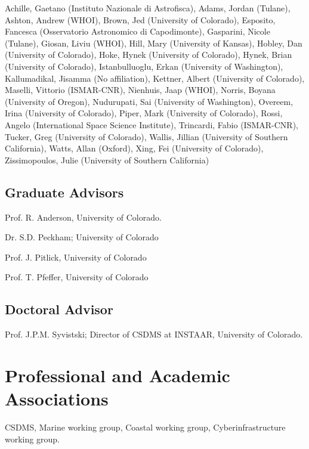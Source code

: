 \documentclass[letterpaper]{resume}
\begin{document}
  Achille, Gaetano (Instituto Nazionale di Astrofisca),
  Adams, Jordan (Tulane),
  Ashton, Andrew  (WHOI),
  Brown, Jed (University of Colorado),
  Esposito, Fancesca (Osservatorio Astronomico di Capodimonte),
  Gasparini, Nicole (Tulane),
  Giosan, Liviu (WHOI),
  Hill, Mary (University of Kansas),
  Hobley, Dan (University of Colorado),
  Hoke, Hynek (University of Colorado),
  Hynek, Brian (University of Colorado),
  Istanbulluoglu, Erkan (University of Washington),
  Kallumadikal, Jisamma (No affiliation),
  Kettner, Albert (University of Colorado),
  Maselli, Vittorio (ISMAR-CNR),
  Nienhuis, Jaap (WHOI),
  Norris, Boyana (University of Oregon),
  Nudurupati, Sai (University of Washington),
  Overeem, Irina (University of Colorado),
  Piper, Mark (University of Colorado),
  Rossi, Angelo (International Space Science Institute),
  Trincardi, Fabio (ISMAR-CNR),
  Tucker, Greg (University of Colorado),
  Wallis, Jillian (University of Southern California),
  Watts, Allan (Oxford),
  Xing, Fei (University of Colorado),
  Zissimopoulos, Julie (University of Southern California)


\subsection{Graduate Advisors}
\begin{multicols}{2}
\begin{compactitem}[\itembullet]
  \item Prof. R. Anderson, University of Colorado.
  \item Dr. S.D. Peckham; University of Colorado
  \item Prof. J. Pitlick, University of Colorado
  \item Prof. T. Pfeffer, University of Colorado
\end{compactitem}
\end{multicols}

\subsection{Doctoral Advisor}
\begin{compactitem}[\itembullet]
  \item Prof. J.P.M. Syvistski; Director of CSDMS at INSTAAR, University of Colorado.
\end{compactitem}

\section{Professional and Academic Associations}

CSDMS, Marine working group, Coastal working group, Cyberinfrastructure working group.

\nocite{}
\end{document}
